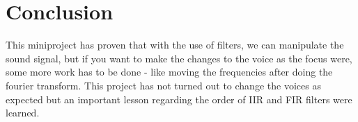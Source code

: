 
\section{Conclusion}
This miniproject has proven that with the use of filters, we can manipulate the sound signal, but if you want to make the changes to the voice as the focus were, some more work has to be done - like moving the frequencies after doing the fourier transform. This project has not turned out to change the voices as expected but an important lesson regarding the order of IIR and FIR filters were learned.